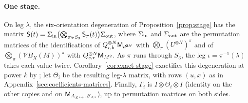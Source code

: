 \paragraph{One stage.}
On leg \(\lambda\), the six-orientation degeneration of
Proposition~\ref{prop:stage} has the matrix
\(\mathsf S(t)=\Sigma_{\rm in}\bigl(\bigotimes_{\pi\in S_3}\mathsf S_\pi(t)\bigr)\Sigma_{\rm out}\),
where \(\Sigma_{\rm in}\) and \(\Sigma_{\rm out}\) are the permutation
matrices of the identifications of \(Q_{r,b}^{\otimes N}\mathsf M_{d^{2N}}\) with
\(\bigotimes_\pi(U^{\otimes N})^\pi\) and of
\(\bigotimes_\pi(\mathcal VB_X(M))^\pi\) with
\(Q_{c,r}^{\otimes N}\mathsf M_{M^2}\). As \(\pi\) runs through \(S_3\), the
leg \(\iota=\pi^{-1}(\lambda)\) takes each value twice.
Corollary~\ref{cor:exact-stage} exactifies this degeneration at power \(k\)
by \citep[Lemma~9.1(c)]{FinCon26}; let \(\Theta_i\) be the resulting
leg-\(\lambda\) matrix, with rows \((u,x)\) as in
Appendix~\ref{sec:coefficients-matrices}. Finally, \(\Gamma_i\) is
\(I\otimes\Theta_i\otimes I\) (identity on the other copies and on
\(\mathsf M_{A_{\ge i+1}B_{<i}}\)), up to permutation matrices on both sides.

